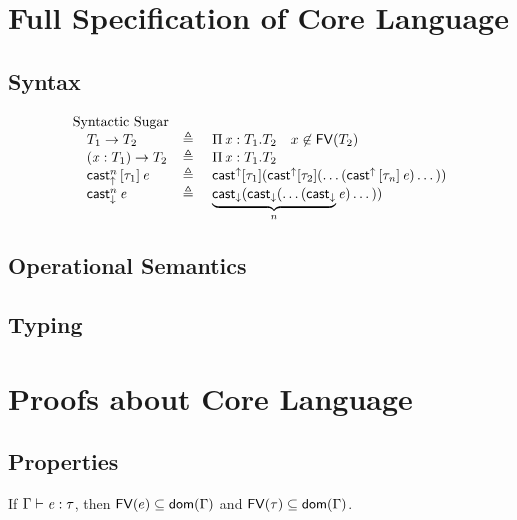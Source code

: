 \section{Full Specification of Core Language}

\subsection{Syntax}
\gram{\otte\ottinterrule
        \ottG\ottinterrule
        \ottv}
\[\ottcoresugar\] %

\subsection{Operational Semantics}
\ottdefnstep{}
\ottusedrule{\ottdruleSXXMu{}}

\subsection{Typing}
\ottdefnctx{}\ottinterrule
\ottdefnexpr{}
\ottusedrule{\ottdruleTXXMu{}}

\section{Proofs about Core Language}
\subsection{Properties}
\begin{lem}\label{lem:appendix:free}
    If $\Gamma  \vdash  \ottnt{e}  \ottsym{:}  \tau$, then $\FV(e) \subseteq \dom(\Gamma)$ and $\FV(\tau)
\subseteq \dom(\Gamma)$.
\end{lem}

